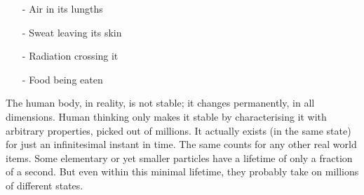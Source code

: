 \begin{itemize}
    \item[-] Air in its lungths
    \item[-] Sweat leaving its skin
    \item[-] Radiation crossing it
    \item[-] Food being eaten
\end{itemize}

The human body, in reality, is not stable; it changes permanently, in all
dimensions. Human thinking only makes it stable by characterising it with
arbitrary properties, picked out of millions. It actually exists (in the same
state) for just an infinitesimal instant in time. The same counts for any other
real world items. Some elementary or yet smaller particles have a lifetime of
only a fraction of a second. But even within this minimal lifetime, they
probably take on millions of different states.

